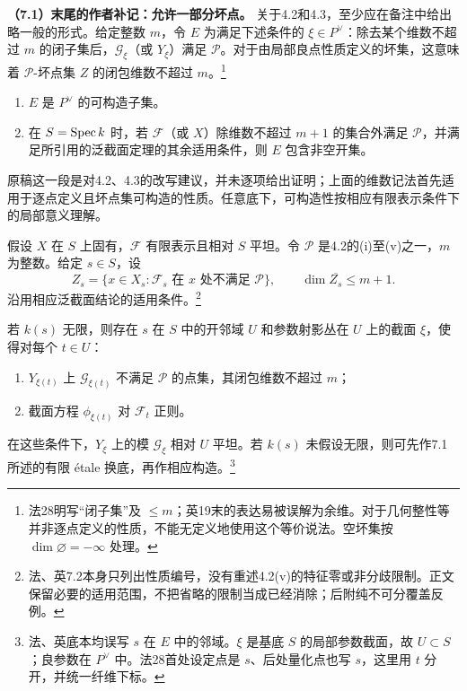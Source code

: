 \begingroup
\def\OO{\mathcal O}\def\FF{\mathcal F}\def\GG{\mathcal G}
\def\PP{\mathbf P}\def\calP{\mathcal P}\def\dd{\delta}
\def\Div{\operatorname{Div}}\def\depth{\operatorname{depth}}
\def\pr{\operatorname{pr}}\def\coker{\operatorname{coker}}
\par\medskip\noindent\textbf{（7.1）末尾的作者补记：允许一部分坏点。}
关于4.2和4.3，至少应在备注中给出略一般的形式。给定整数 $m$，令 $E$ 为满足下述条件的 $\xi\in P^\vee$：除去某个维数不超过 $m$ 的闭子集后，$\GG_\xi$（或 $Y_\xi$）满足 $\calP$。对于由局部良点性质定义的坏集，这意味着 $\calP$-坏点集 $Z$ 的闭包维数不超过 $m$。\footnote{法28明写“闭子集”及 $\le m$；英19末的表达易被误解为余维。对于几何整性等并非逐点定义的性质，不能无定义地使用这个等价说法。空坏集按 $\dim\varnothing=-\infty$ 处理。}

\begin{enumerate}[label=\alph*)]
\item $E$ 是 $P^\vee$ 的可构造子集。
\item 在 $S=\operatorname{Spec} k$ 时，若 $\FF$（或 $X$）除维数不超过 $m+1$ 的集合外满足 $\calP$，并满足所引用的泛截面定理的其余适用条件，则 $E$ 包含非空开集。
\end{enumerate}
\noindent 原稿这一段是对4.2、4.3的改写建议，并未逐项给出证明；上面的维数记法首先适用于逐点定义且坏点集可构造的性质。任意底下，可构造性按相应有限表示条件下的局部意义理解。

假设 $X$ 在 $S$ 上固有，$\FF$ 有限表示且相对 $S$ 平坦。令 $\calP$ 是4.2的(i)至(v)之一，$m$ 为整数。给定 $s\in S$，设
\[
 Z_s=\{x\in X_s:\FF_s\text{ 在 }x\text{ 处不满足 }\calP\},
 \qquad \dim\overline{Z_s}\le m+1.
\]
沿用相应泛截面结论的适用条件。\footnote{法、英7.2本身只列出性质编号，没有重述4.2(v)的特征零或非分歧限制。正文保留必要的适用范围，不把省略的限制当成已经消除；后附纯不可分覆盖反例。}

若 $k(s)$ 无限，则存在 $s$ 在 $S$ 中的开邻域 $U$ 和参数射影丛在 $U$ 上的截面 $\xi$，使得对每个 $t\in U$：
\begin{enumerate}[label=(\roman*)]
\item $Y_{\xi(t)}$ 上 $\GG_{\xi(t)}$ 不满足 $\calP$ 的点集，其闭包维数不超过 $m$；
\item 截面方程 $\phi_{\xi(t)}$ 对 $\FF_t$ 正则。
\end{enumerate}
在这些条件下，$Y_\xi$ 上的模 $\GG_\xi$ 相对 $U$ 平坦。若 $k(s)$ 未假设无限，则可先作7.1所述的有限 étale 换底，再作相应构造。\footnote{法、英底本均误写 $s$ 在 $E$ 中的邻域。$\xi$ 是基底 $S$ 的局部参数截面，故 $U\subset S$；良参数在 $P^\vee$ 中。法28首处设定点是 $s$、后处量化点也写 $s$，这里用 $t$ 分开，并统一纤维下标。}

